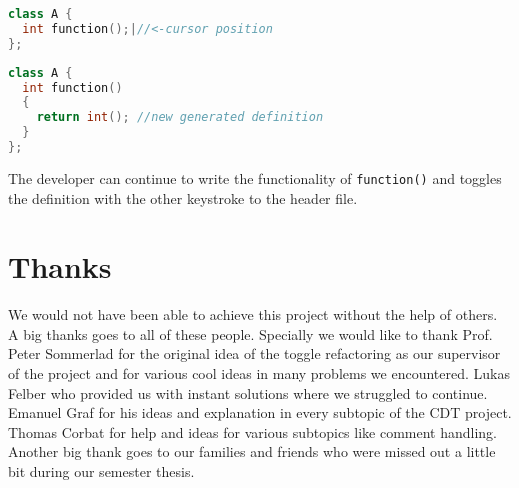 \begin{lstlisting}[caption={Situation before quick implement},
label={beforeimpl}, language=C++]
class A {
  int function();|//<-cursor position
};
\end{lstlisting}

\begin{lstlisting}[caption={Situation after quick implement},
label={beforeimpl}, language=C++]
class A {
  int function()
  {
    return int(); //new generated definition
  }
};
\end{lstlisting}

The developer can continue to write the functionality of \texttt{function()}
and toggles the definition with the other keystroke to the header file.

\thispagestyle{empty}
\pagebreak

\chapter*{Thanks}
We would not have been able to achieve this project without the help of others.
A big thanks goes to all of these people.\newline
Specially we would like to thank Prof. Peter Sommerlad for the original idea
of the toggle refactoring as our supervisor of the project and for various cool
ideas in many problems we encountered. Lukas Felber who provided us with
instant solutions where we struggled to continue. Emanuel Graf for his ideas and
explanation in every subtopic of the CDT project. Thomas Corbat for help and
ideas for various subtopics like comment handling. \newline
Another big thank goes to our families and friends who were missed out a little
bit during our semester thesis.
\thispagestyle{empty}

